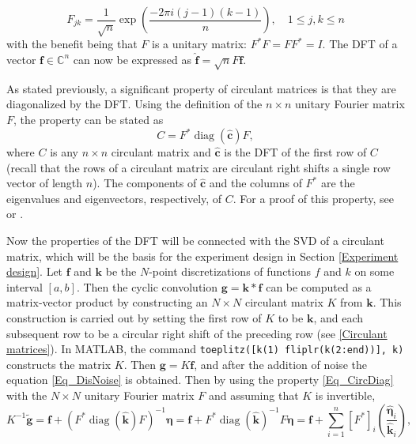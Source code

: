 \documentclass[12pt]{article}
\newcommand{\kcon}{k}
\newcommand{\fcon}{f}
\newcommand{\gdis}{\mathbf{g}}
\newcommand{\gnoise}{\widetilde{\mathbf{g}}}
\newcommand{\kdis}{\mathbf{k}}
\newcommand{\kmat}{K}	%
\newcommand{\fdis}{\mathbf{f}}
\newcommand{\ctrans}{*}	%
\newcommand{\diag}{\operatorname{diag}}
\newcommand{\noise}{\bm{\eta}}	%
\begin{document}
\begin{equation}
F_{jk} = \frac{1}{\sqrt{n}}\exp\left(\frac{-2\pi{i(j-1)(k-1)}}{n}\right), \quad 1 \leq j,k \leq n
\label{Eq_DFT-Matrix}
\end{equation}
with the benefit being that $F$ is a unitary matrix: $F^\ctrans{F} = FF^\ctrans = I$. The DFT of a vector $\mathbf{f}\in\mathbb{C}^n$ can now be expressed as $\widehat{\mathbf{f}} = \sqrt{n}F\mathbf{f}$. \par 
As stated previously, a significant property of circulant matrices is that they are diagonalized by the DFT. Using the definition of the $n \times n$ unitary Fourier matrix $F$, the property can be stated as
\begin{equation}
C = F^\ctrans\diag(\widehat{\mathbf{c}})F,
\label{Eq_CircDiag}
\end{equation}
where $C$ is any $n \times n$ circulant matrix and $\widehat{\mathbf{c}}$ is the DFT of the first row of $C$ (recall that the rows of a circulant matrix are circulant right shifts a single row vector of length $n$). The components of $\widehat{\mathbf{c}}$ and the columns of $F^\ctrans$ are the eigenvalues and eigenvectors, respectively, of $C$. For a proof of this property, see \cite{BoggessAlbert2001Afci} or \cite{Vogel:2002}. \par
Now the properties of the DFT will be connected with the SVD of a circulant matrix, which will be the basis for the experiment design in Section \ref{Experiment design}. Let $\fdis$ and $\kdis$ be the $N$-point discretizations of functions $\fcon$ and $\kcon$ on some interval $[a,b]$. Then the cyclic convolution $\gdis = \kdis * \fdis$ can be computed as a matrix-vector product by constructing an $N \times N$ circulant matrix $\kmat$ from $\kdis$. This construction is carried out by setting the first row of $\kmat$ to be $\kdis$, and each subsequent row to be a circular right shift of the preceding row (see \ref{Circulant matrices}). In MATLAB, the command \texttt{toeplitz([k(1) fliplr(k(2:end))], k)} constructs the matrix $\kmat$. Then $\gdis = \kmat\fdis$, and after the addition of noise the equation \eqref{Eq_DisNoise} is obtained. Then by using the property \eqref{Eq_CircDiag} with the $N \times N$ unitary Fourier matrix $F$ and assuming that $\kmat$ is invertible, 
\begin{equation}
\kmat^{-1}\gnoise = \fdis + (F^*\diag(\widehat{\kdis})F)^{-1}\noise = \fdis + F^*\diag(\widehat{\kdis})^{-1}F\noise = \fdis + \sum_{i = 1}^n [F^*]_i\left(\frac{\widehat{\noise}_i}{\widehat{\kdis}_i}\right),
\label{Eq_InvProdDFT}
\end{equation}
\end{document}
